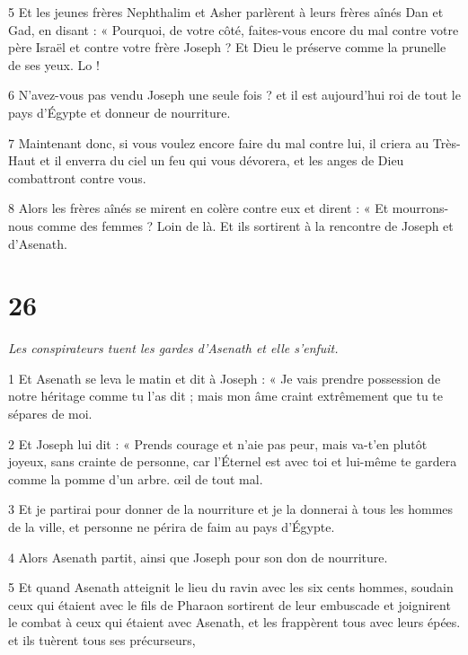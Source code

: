 \par 5 Et les jeunes frères Nephthalim et Asher parlèrent à leurs frères aînés Dan et Gad, en disant : « Pourquoi, de votre côté, faites-vous encore du mal contre votre père Israël et contre votre frère Joseph ? Et Dieu le préserve comme la prunelle de ses yeux. Lo !

\par 6 N'avez-vous pas vendu Joseph une seule fois ? et il est aujourd'hui roi de tout le pays d'Égypte et donneur de nourriture.

\par 7 Maintenant donc, si vous voulez encore faire du mal contre lui, il criera au Très-Haut et il enverra du ciel un feu qui vous dévorera, et les anges de Dieu combattront contre vous.

\par 8 Alors les frères aînés se mirent en colère contre eux et dirent : « Et mourrons-nous comme des femmes ? Loin de là. Et ils sortirent à la rencontre de Joseph et d'Asenath.

\chapter{26}

\par \textit{Les conspirateurs tuent les gardes d'Asenath et elle s'enfuit.}


\par 1 Et Asenath se leva le matin et dit à Joseph : « Je vais prendre possession de notre héritage comme tu l'as dit ; mais mon âme craint extrêmement que tu te sépares de moi.

\par 2 Et Joseph lui dit : « Prends courage et n'aie pas peur, mais va-t'en plutôt joyeux, sans crainte de personne, car l'Éternel est avec toi et lui-même te gardera comme la pomme d'un arbre. œil de tout mal.

\par 3 Et je partirai pour donner de la nourriture et je la donnerai à tous les hommes de la ville, et personne ne périra de faim au pays d'Égypte.

\par 4 Alors Asenath partit, ainsi que Joseph pour son don de nourriture.

\par 5 Et quand Asenath atteignit le lieu du ravin avec les six cents hommes, soudain ceux qui étaient avec le fils de Pharaon sortirent de leur embuscade et joignirent le combat à ceux qui étaient avec Asenath, et les frappèrent tous avec leurs épées. et ils tuèrent tous ses précurseurs,

